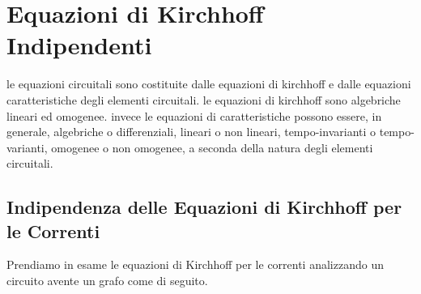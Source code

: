 \documentclass[a4paper]{report}
\begin{document}
\section{Equazioni di Kirchhoff Indipendenti}
le equazioni circuitali sono costituite dalle equazioni di kirchhoff e
dalle equazioni caratteristiche degli elementi circuitali. le
equazioni di kirchhoff sono algebriche lineari ed omogenee. invece le
equazioni di caratteristiche possono essere, in generale, algebriche o
differenziali, lineari o non lineari, tempo-invarianti o
tempo-varianti, omogenee o non omogenee, a seconda della natura degli
elementi circuitali.

\subsection{Indipendenza delle Equazioni di Kirchhoff per le Correnti}
Prendiamo in esame le equazioni di Kirchhoff per le correnti
analizzando un circuito avente un grafo come di seguito.
\end{document}
